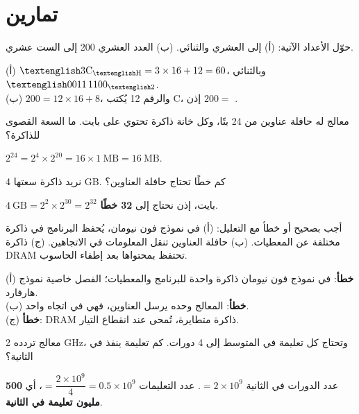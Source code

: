 \section{تمارين}

\begin{tamrin}
    حوّل الأعداد الآتية: (أ)  إلى العشري والثنائي. (ب) العدد العشري 200 إلى الست عشري.
\end{tamrin}
\begin{hall}
    (أ) $\hex{3C} = 3 \times 16 + 12 = 60$، وبالثنائي $\bin{0011\,1100}$.\\
    (ب) $200 = 12 \times 16 + 8$، والرقم 12 يُكتب \textenglish{C}، إذن $200 = $ .
\end{hall}

\begin{tamrin}
    معالج له حافلة عناوين من 24 بتًا، وكل خانة ذاكرة تحتوي على بايت. ما السعة القصوى للذاكرة؟
\end{tamrin}
\begin{hall}
    $2^{24} = 2^{4} \times 2^{20} = 16 \times 1\ \text{MB} = 16\ \text{MB}$.
\end{hall}

\begin{tamrin}
    نريد ذاكرة سعتها \textenglish{4 GB}. كم خطًا تحتاج حافلة العناوين؟
\end{tamrin}
\begin{hall}
    $4\ \text{GB} = 2^{2} \times 2^{30} = 2^{32}$ بايت، إذن نحتاج إلى \textbf{32 خطًا}.
\end{hall}

\begin{tamrin}
    أجب بصحيح أو خطأ مع التعليل:
    (أ) في نموذج فون نيومان، يُحفظ البرنامج في ذاكرة مختلفة عن المعطيات.
    (ب) حافلة العناوين تنقل المعلومات في الاتجاهين.
    (ج) ذاكرة \textenglish{DRAM} تحتفظ بمحتواها بعد إطفاء الحاسوب.
\end{tamrin}
\begin{hall}
    (أ) \textbf{خطأ}: في نموذج فون نيومان ذاكرة واحدة للبرنامج والمعطيات؛ الفصل خاصية نموذج هارفارد.\\
    (ب) \textbf{خطأ}: المعالج وحده يرسل العناوين، فهي في اتجاه واحد.\\
    (ج) \textbf{خطأ}: \textenglish{DRAM} ذاكرة متطايرة، تُمحى عند انقطاع التيار.
\end{hall}

\begin{tamrin}
    معالج تردده \textenglish{2 GHz}، وتحتاج كل تعليمة في المتوسط إلى 4 دورات. كم تعليمة ينفذ في الثانية؟
\end{tamrin}
\begin{hall}
    عدد الدورات في الثانية $= 2 \times 10^{9}$. عدد التعليمات $= \dfrac{2 \times 10^{9}}{4} = 0.5 \times 10^{9}$،
    أي \textbf{500 مليون تعليمة في الثانية}.
\end{hall}
